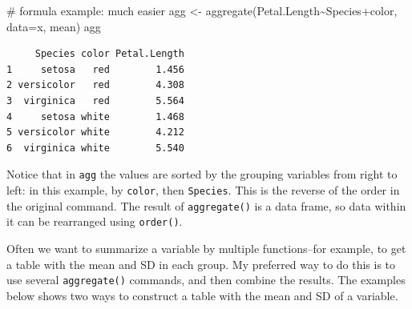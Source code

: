 \documentclass[
  13,
  letterpaper,
]{report}
\newenvironment{Shaded}{\begin{snugshade}}{\end{snugshade}}
\newcommand{\AttributeTok}[1]{\textcolor[rgb]{0.40,0.45,0.13}{#1}}
\newcommand{\CommentTok}[1]{\textcolor[rgb]{0.37,0.37,0.37}{#1}}
\newcommand{\FunctionTok}[1]{\textcolor[rgb]{0.28,0.35,0.67}{#1}}
\newcommand{\NormalTok}[1]{\textcolor[rgb]{0.00,0.23,0.31}{#1}}
\newcommand{\OtherTok}[1]{\textcolor[rgb]{0.00,0.23,0.31}{#1}}
\newcommand{\SpecialCharTok}[1]{\textcolor[rgb]{0.37,0.37,0.37}{#1}}
\newcommand{\StringTok}[1]{\textcolor[rgb]{0.13,0.47,0.30}{#1}}
\begin{document}
\begin{Shaded}
\begin{Highlighting}[]
\CommentTok{\# formula example: much easier}
\NormalTok{agg }\OtherTok{\textless{}{-}} \FunctionTok{aggregate}\NormalTok{(Petal.Length}\SpecialCharTok{\textasciitilde{}}\NormalTok{Species}\SpecialCharTok{+}\NormalTok{color, }\AttributeTok{data=}\NormalTok{x, mean)}
\NormalTok{agg}
\end{Highlighting}
\end{Shaded}

\begin{verbatim}
     Species color Petal.Length
1     setosa   red        1.456
2 versicolor   red        4.308
3  virginica   red        5.564
4     setosa white        1.468
5 versicolor white        4.212
6  virginica white        5.540
\end{verbatim}

Notice that in \texttt{agg} the values are sorted by the grouping
variables from right to left: in this example, by \texttt{color}, then
\texttt{Species}. This is the reverse of the order in the original
command. The result of \texttt{aggregate()} is a data frame, so data
within it can be rearranged using \texttt{order()}.

Often we want to summarize a variable by multiple functions--for
example, to get a table with the mean and SD in each group. My preferred
way to do this is to use several \texttt{aggregate()} commands, and then
combine the results. The examples below shows two ways to construct a
table with the mean and SD of a variable.

\begin{Shaded}
\end{Shaded}
\end{document}
